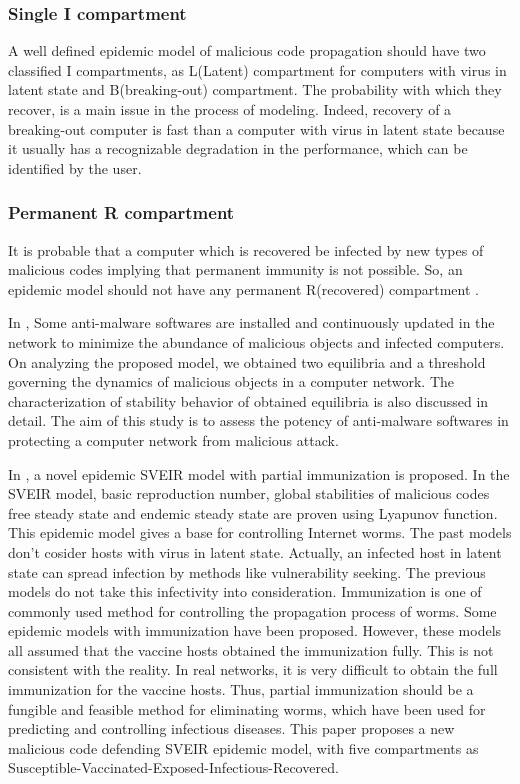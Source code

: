 \subsubsection{Single I compartment}
A well defined epidemic model of malicious code propagation should have two classified I compartments, as L(Latent) compartment for computers with virus in latent state and B(breaking-out) compartment. The probability with which they recover, is a main issue in the  process of modeling. Indeed, recovery of a breaking-out computer is fast than a computer with virus in latent state because it usually has a recognizable degradation in the performance, which can be identified by the user.
\subsubsection{Permanent R compartment}
It is probable that a computer which is recovered be infected by new types of malicious codes implying that permanent immunity is not possible. So, an epidemic model should not have any permanent R(recovered) compartment \cite{yang2012towards}.


In \cite{misra2014capturing}, Some anti-malware softwares are installed and continuously updated in the network to minimize the abundance of malicious objects and infected computers. On analyzing the proposed model, we obtained two equilibria and a threshold governing the dynamics of malicious objects in a computer network. The characterization of stability behavior of obtained equilibria is also discussed in detail. The aim of this study is to assess the potency of anti-malware softwares in protecting a computer network from malicious attack.


In \cite{wang2015worm}, a novel epidemic SVEIR model with partial immunization is proposed. In the SVEIR model, basic reproduction number, global stabilities of malicious codes free steady state and endemic steady state are proven using Lyapunov function. This epidemic model gives a base for controlling Internet worms. The past models don't cosider hosts with virus in latent state. Actually, an infected host in latent state can spread infection by methods like vulnerability seeking. The previous models do not take this infectivity into consideration. Immunization is one of commonly used method for controlling the propagation process of worms. Some epidemic models with immunization have been proposed. However, these models all assumed that the vaccine hosts obtained the immunization fully. This is not consistent with the reality. In real networks, it is very difficult to obtain the full immunization for the vaccine hosts. Thus, partial immunization should be a fungible and feasible method for eliminating worms, which have been used for predicting and controlling infectious diseases. This paper proposes a new malicious code defending SVEIR epidemic model, with five compartments as Susceptible-Vaccinated-Exposed-Infectious-Recovered.



